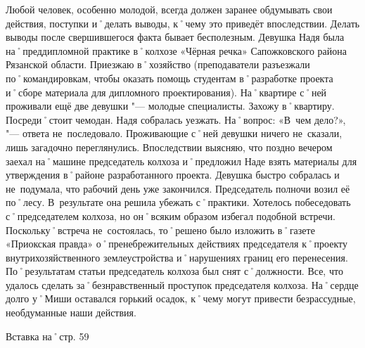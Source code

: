 Любой человек, особенно молодой, всегда должен заранее обдумывать свои действия, поступки и˚делать выводы, к˚чему это приведёт впоследствии. Делать выводы после свершившегося факта бывает бесполезным. Девушка Надя была на˚преддипломной практике в˚колхозе «Чёрная речка» Сапожковского района Рязанской области. Приезжаю в˚хозяйство (преподаватели разъезжали по˚командировкам, чтобы оказать помощь студентам в˚разработке проекта и˚сборе материала для дипломного проектирования). На˚квартире с˚ней проживали ещё две девушки "--- молодые специалисты. Захожу в˚квартиру. Посреди˚стоит чемодан. Надя собралась уезжать. На˚вопрос: «В~чем дело?», "--- ответа не~последовало. Проживающие с˚ней девушки ничего не~сказали, лишь загадочно переглянулись. Впоследствии выясняю, что поздно вечером заехал на˚машине председатель колхоза и˚предложил Наде взять материалы для утверждения в˚районе разработанного проекта. Девушка быстро собралась и не~подумала, что рабочий день уже закончился. Председатель полночи возил её по˚лесу. В~результате она решила убежать с˚практики. Хотелось побеседовать с˚председателем колхоза, но он˚всяким образом избегал подобной встречи. Поскольку˚встреча не~состоялась, то˚решено было изложить в˚газете «Приокская правда» о˚пренебрежительных действиях председателя к˚проекту внутрихозяйственного землеустройства и˚нарушениях границ его перенесения. По˚результатам статьи председатель колхоза был снят с˚должности. Все, что удалось сделать за˚безнравственный проступок председателя колхоза. На˚сердце долго у˚Миши оставался горький осадок, к˚чему могут привести безрассудные, необдуманные наши действия.

Вставка на˚стр. 59

